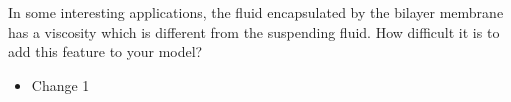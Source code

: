 \documentclass[11pt]{article}
\newcommand{\comment}[1]{{\color{blue} #1}}
\begin{document}
\noindent
\comment{In some interesting applications, the fluid encapsulated by the
bilayer membrane has a viscosity which is different from the suspending
fluid. How difficult it is to add this feature to your model?}
\begin{itemize}
  \item Change 1 
\end{itemize}
\end{document}

